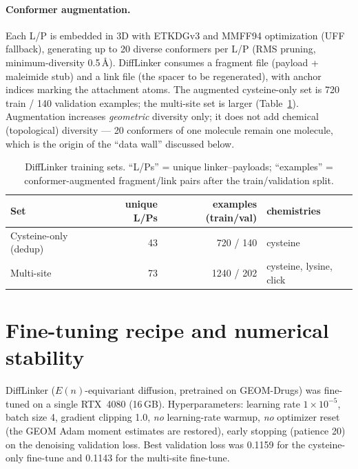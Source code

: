 \documentclass[10pt]{article}
\begin{document}
\paragraph{Conformer augmentation.}
Each L/P is embedded in 3D with ETKDGv3 and MMFF94 optimization (UFF fallback), generating up to 20
diverse conformers per L/P (RMS pruning, minimum-diversity 0.5\,\AA). DiffLinker consumes a fragment file
(payload + maleimide stub) and a link file (the spacer to be regenerated), with anchor indices marking the
attachment atoms. The augmented cysteine-only set is 720 train / 140 validation examples; the multi-site
set is larger (Table~\ref{tab:datasets}). Augmentation increases \emph{geometric} diversity only; it does
not add chemical (topological) diversity --- 20 conformers of one molecule remain one molecule, which is
the origin of the ``data wall'' discussed below.

\begin{table}[t]
\caption{DiffLinker training sets. ``L/Ps'' = unique linker--payloads; ``examples'' = conformer-augmented
fragment/link pairs after the train/validation split.}
\label{tab:datasets}
\centering\small
\begin{tabular}{@{}lrrl@{}}
\toprule
\rowcolor{tint}Set & unique L/Ps & examples (train/val) & chemistries \\
\midrule
Cysteine-only (dedup) & 43 & 720 / 140 & cysteine \\
Multi-site            & 73 & 1240 / 202 & cysteine, lysine, click \\
\bottomrule
\end{tabular}
\end{table}

\section{Fine-tuning recipe and numerical stability}
\label{si:finetune}

DiffLinker\cite{igashov2024} ($E(n)$-equivariant diffusion, pretrained on GEOM-Drugs\cite{axelrod2022})
was fine-tuned on a single RTX~4080 (16\,GB). Hyperparameters: learning rate $1\times10^{-5}$, batch
size 4, gradient clipping 1.0, \emph{no} learning-rate warmup, \emph{no} optimizer reset (the GEOM Adam
moment estimates are restored), early stopping (patience 20) on the denoising validation loss. Best
validation loss was 0.1159 for the cysteine-only fine-tune and 0.1143 for the multi-site fine-tune.
\end{document}
